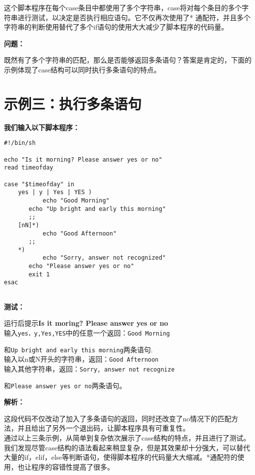 \documentclass{ctexart}
\begin{document}
\begin{sloppypar}
这个脚本程序在每个case条目中都使用了多个字符串，case将对每个条目的多个字符串进行测试，以决定是否执行相应语句。它不仅再次使用了* 通配符，并且多个字符串的判断使用替代了多个if语句的使用大大减少了脚本程序的代码量。

{\bfseries 问题：}

既然有了多个字符串的匹配，那么是否能够返回多条语句？答案是肯定的，下面的示例体现了case结构可以同时执行多条语句的特点。

\section{示例三：执行多条语句}

{\bfseries 我们输入以下脚本程序：}

\begin{verbatim}
#!/bin/sh

echo "Is it morning? Please answer yes or no"
read timeofday

case "$timeofday" in
    yes | y | Yes | YES )
           echo "Good Morning"
	   echo "Up bright and early this morning"
	   ;;
    [nN]*)
           echo "Good Afternoon"
	   ;;
    *)
           echo "Sorry, answer not recognized"
	   echo "Please answer yes or no"
	   exit 1
esac


\end{verbatim}

{\bfseries 测试：}

运行后提示{\bfseries Is it moring? Please answer yes or no}\\

输入\verb|yes，y,Yes,YES|中的任意一个返回：\verb|Good Morning|

和\verb|Up bright and early this morning|两条语句.\\

输入以n或N开头的字符串，返回：\verb|Good Afternoon|\\

输入其他字符串，返回：\verb|Sorry, answer not recognize|

和\verb|Please answer yes or no|两条语句。

{\bfseries 解析：}

这段代码不仅改动了加入了多条语句的返回，同时还改变了no情况下的匹配方法，并且给出了另外一个退出码，让脚本程序具有可重复性。\\


通过以上三条示例，从简单到复杂依次展示了case结构的特点，并且进行了测试。我们发现尽管case结构的语法看起来稍显复杂，但是其效果却十分强大，可以替代大量的if，elif，else等判断语句，使得脚本程序的代码量大大缩减。*通配符的使用，也让程序的容错性提高了很多。

\end{sloppypar}
\end{document}
